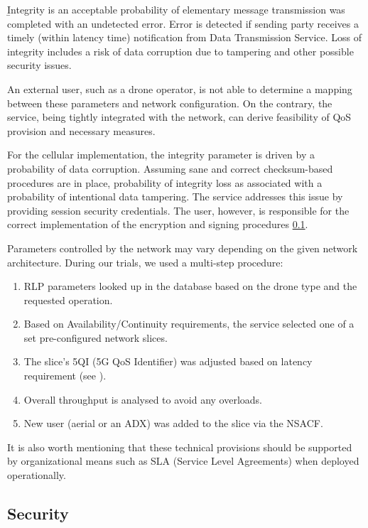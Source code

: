 \documentclass[a4paper,conference]{IEEEtran}
\begin{document}
{\b Integrity} is an acceptable probability of elementary message transmission was completed with an undetected error. Error is detected if sending party receives a timely (within latency time) notification from Data Transmission Service. Loss of integrity includes a risk of data corruption due to tampering and other possible security issues.

An external user, such as a drone operator, is not able to determine a mapping between these parameters and network configuration. On the contrary, the service, being tightly integrated with the network, can derive feasibility of QoS provision and necessary measures.

For the cellular implementation, the integrity parameter is driven by a probability of data corruption. Assuming sane and correct checksum-based procedures are in place, probability of integrity loss as associated with a probability of intentional data tampering. The service addresses this issue by providing session security credentials. The user, however, is responsible for the correct implementation of the encryption and signing procedures \ref{security}.

Parameters controlled by the network may vary depending on the given network architecture. During our trials, we used a multi-step procedure:

\begin{enumerate}
\item RLP parameters looked up in the database based on the drone type and the requested operation.
\item Based on Availability/Continuity requirements, the service selected one of a set pre-configured network slices.
\item The slice's 5QI (5G QoS Identifier) was adjusted based on latency requirement (see \cite{3gpp:rely}).
\item Overall throughput is analysed to avoid any overloads.
\item New user (aerial or an ADX) was added to the slice via the NSACF.
\end{enumerate}

It is also worth mentioning that these technical provisions should be supported by organizational means such as SLA (Service Level Agreements) when deployed operationally.

\subsection{Security}
\label{security}
\end{document}
